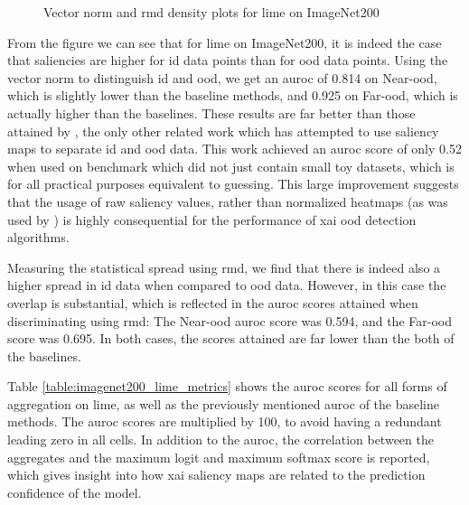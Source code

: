 \documentclass[UKenglish]{uiomasterthesis} %
\theoremstyle{definition}
\begin{document}
\begin{figure}[H]
    \begin{center}
        
    \end{center}
    \caption{Vector norm and \acs*{rmd} density plots for \acs*{lime} on ImageNet200}
    \label{fig:imagenet200limemeangini}
\end{figure}

From the figure we can see that for \ac{lime} on ImageNet200, it is indeed the case that saliencies are higher for \ac{id} data points than for \ac{ood} data points. Using the vector norm to distinguish \ac{id} and \ac{ood}, we get an \ac{auroc} of 0.814 on Near-\ac{ood}, which is slightly lower than the baseline methods, and 0.925 on Far-\ac{ood}, which is actually higher than the baselines. These results are far better than those attained by \cite{martinez}, the only other related work which has attempted to use saliency maps to separate \ac{id} and \ac{ood} data. This work achieved an \ac{auroc} score of only 0.52 when used on benchmark which did not just contain small toy datasets, which is for all practical purposes equivalent to guessing. This large improvement suggests that the usage of raw saliency values, rather than normalized heatmaps (as was used by \cite{martinez}) is highly consequential for the performance of \ac{xai} \ac{ood} detection algorithms.

Measuring the statistical spread using \ac{rmd}, we find that there is indeed also a higher spread in \ac{id} data when compared to \ac{ood} data. However, in this case the overlap is substantial, which is reflected in the \ac{auroc} scores attained when discriminating using \ac{rmd}: The Near-\ac{ood} \ac{auroc} score was 0.594, and the Far-\ac{ood} score was 0.695. In both cases, the scores attained are far lower than the both of the baselines.

Table \ref{table:imagenet200_lime_metrics} shows the \ac{auroc} scores for all forms of aggregation on \ac{lime}, as well as the previously mentioned \ac{auroc} of the baseline methods. The \ac{auroc} scores are multiplied by 100, to avoid having a redundant leading zero in all cells. In addition to the \ac{auroc}, the correlation between the aggregates and the maximum logit and maximum softmax score is reported, which gives insight into how \ac{xai} saliency maps are related to the prediction confidence of the model.
\end{document}
